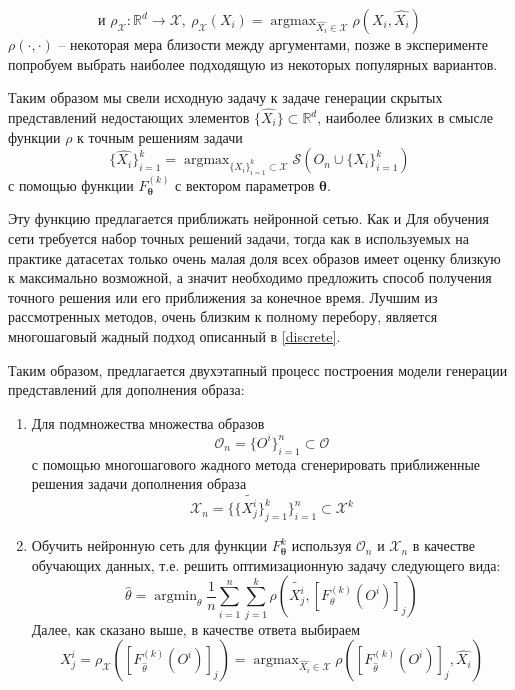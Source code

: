\documentclass[a4paper,14pt]{extarticle}
\DeclareMathOperator*{\argmax}{argmax}
\DeclareMathOperator*{\argmin}{argmin}
\begin{document}
			 $$\text{и }\rho_\mathcal{X}: \mathbb{R}^d\longrightarrow \mathcal{X}, ~ \rho_\mathcal{X}(X_i) = \argmax_{\hat{X_i}\in\mathcal{X}}\rho(X_i, \hat{X_i})$$
			$\rho(\cdot, \cdot)$ -- некоторая мера близости между аргументами, позже в эксперименте попробуем выбрать наиболее подходящую из некоторых популярных вариантов.
			 
			Таким образом мы свели исходную задачу к задаче генерации скрытых представлений недостающих элементов $\{\hat{X_i}\}\subset \mathbb{R}^d$, наиболее близких в смысле функции $\rho$ к точным решениям задачи
			$$\{\hat{X_i}\}_{i=1}^k= \argmax_{\{X_i\}_{i=1}^k\subset\mathcal{X}} \mathcal{S}\left(O_n\cup\{X_i\}_{i=1}^k\right)$$
			с помощью функции  $F^{(k)}_\mathbf{\theta}$ с вектором параметров $\mathbf{\theta}$. 
			
			Эту функцию предлагается приближать нейронной сетью. Как и 
			Для обучения сети требуется набор точных решений задачи, тогда как в используемых на практике датасетах только очень малая доля всех образов имеет оценку близкую к максимально возможной, а значит необходимо предложить способ получения точного решения или его приближения за конечное время. Лучшим из рассмотренных методов, очень близким к полному перебору, является многошаговый жадный подход описанный в \ref{discrete}. 
			
			Таким образом, предлагается двухэтапный процесс построения модели генерации представлений для дополнения образа:
			\begin{enumerate}
				\item Для подмножества множества образов 
				$$\mathcal{O}_n = \{O^i\}_{i=1}^n \subset\mathcal{O}$$
				 с помощью многошагового жадного метода сгенерировать приближенные решения задачи дополнения образа $$\mathcal{X}_n =\{\{\tilde{X_j^i}\}_{j=1}^k\}_{i=1}^n\subset\mathcal{X}^k$$
				  
				\item\label{step2} Обучить нейронную сеть для функции $F^{k}_\mathbf{\theta}$ используя $\mathcal{O}_n$ и $\mathcal{X}_n$ в качестве обучающих данных, т.е. решить оптимизационную задачу следующего вида:
				$$\hat{\theta} = \argmin_\theta \frac{1}{n}\sum_{i=1}^n\sum_{j=1}^k\rho\left(\tilde{X_j^i}, \left[F^{(k)}_{\theta}(O^i)\right]_j\right)$$
				Далее, как сказано выше, в качестве ответа выбираем
				$$X_j^i = \rho_\mathcal{X}\left(\left[F^{(k)}_{\hat{\theta}}(O^i)\right]_j\right) = \argmax_{\hat{X_i}\in\mathcal{X}}\rho\left(\left[F^{(k)}_{\hat{\theta}}(O^i)\right]_j, \hat{X_i}\right)$$
			\end{enumerate}
		
\end{document}
